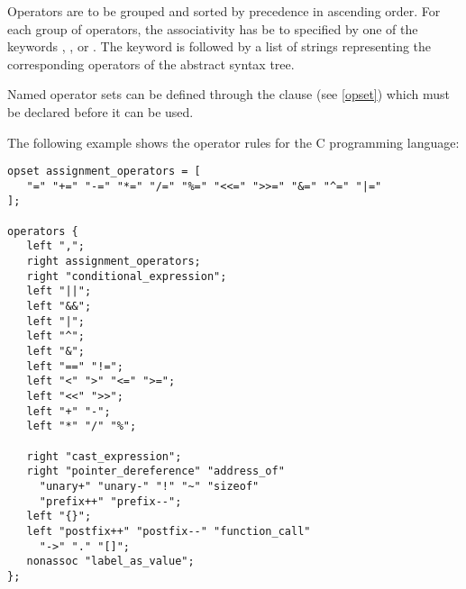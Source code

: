 \noindent
Operators are to be grouped and sorted by precedence in ascending order.
For each group of operators, the associativity has be to specified
by one of the keywords , , or .
The keyword is followed by a list of strings representing the
corresponding operators of the abstract syntax tree.

Named operator sets can be defined through the  clause
(see \ref{opset}) which must be declared before it can be used.

The following example shows the operator rules for the C
programming language:

\begin{lstlisting}
opset assignment_operators = [
   "=" "+=" "-=" "*=" "/=" "%=" "<<=" ">>=" "&=" "^=" "|="
];

operators {
   left ",";
   right assignment_operators;
   right "conditional_expression";
   left "||";
   left "&&";
   left "|";
   left "^";
   left "&";
   left "==" "!=";
   left "<" ">" "<=" ">=";
   left "<<" ">>";
   left "+" "-";
   left "*" "/" "%";

   right "cast_expression";
   right "pointer_dereference" "address_of"
	 "unary+" "unary-" "!" "~" "sizeof"
	 "prefix++" "prefix--";
   left "{}";
   left "postfix++" "postfix--" "function_call"
	 "->" "." "[]";
   nonassoc "label_as_value";
};
\end{lstlisting}

\endinput
